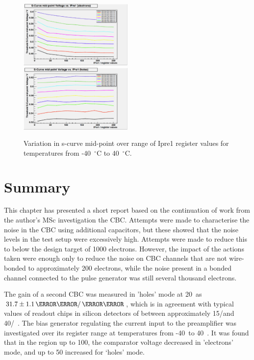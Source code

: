 \begin{figure}[hbtp]
   \centering
     \includegraphics[width=0.5\textwidth]{Chapters/07_Appendices/07c_2_Images/scurve_midpoint_v_ipre1_electrons}\hfill
     \includegraphics[width=0.5\textwidth]{Chapters/07_Appendices/07c_2_Images/scurve_midpoint_v_ipre1_holes}
     \caption{Variation in s-curve mid-point over range of Ipre1 register values for temperatures from
     -40~$^{\circ}$C to 40~$^{\circ}$C.}
     \label{fig:midpoint_v_ipre1}
\end{figure}

\section{Summary}
\label{s:summary}
This chapter has presented a short report based on the continuation of work from the author's MSc
investigation the CBC. Attempts were made to characterise the noise in the CBC using additional capacitors,
but these showed that the noise levels in the test setup were excessively high. Attempts were made to reduce this to below
the design target of 1000 electrons. However, the impact of the actions taken were enough only to reduce the
noise on CBC channels that are not wire-bonded to approximately 200 electrons, while the noise present in a
bonded channel connected to the pulse generator was still several thousand electrons. 

The gain of a second CBC was measured in 'holes' mode at 20~\degreeCelsius as $31.7\pm1.1\mV/\fC$, which is in
agreement with typical values of readout chips in silicon detectors of between approximately 15\mV/\fC and
40\mV/\fC~\cite{Kaplon:2001jh}. The bias generator regulating the current input to the preamplifier was
investigated over its register range at temperatures from -40~\degreeCelsius to 40~\degreeCelsius. It was
found that in the region up to 100\uA, the comparator voltage decreased in 'electrons' mode, and up to 50\uA
increased for `holes' mode.

